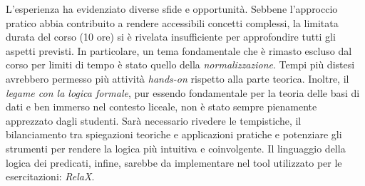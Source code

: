 \documentclass[withtimes]{easychair}
\begin{document}
L'esperienza ha evidenziato diverse sfide e opportunità. Sebbene l'approccio pratico abbia contribuito a rendere accessibili concetti complessi, la limitata durata del corso (10 ore) si è rivelata insufficiente per approfondire tutti gli aspetti previsti. In particolare, un tema fondamentale che è rimasto escluso dal corso per limiti di tempo è stato quello della \emph{normalizzazione}. Tempi più distesi avrebbero permesso più attività \emph{hands-on} rispetto alla parte teorica. Inoltre, il \emph{legame con la logica formale}, pur essendo fondamentale per la teoria delle basi di dati e ben immerso nel contesto liceale, non è stato sempre pienamente apprezzato dagli studenti. Sarà necessario rivedere le tempistiche, il bilanciamento tra spiegazioni teoriche e applicazioni pratiche e potenziare gli strumenti per rendere la logica più intuitiva e coinvolgente. Il linguaggio della logica dei predicati, infine, sarebbe da implementare nel tool utilizzato per le esercitazioni: \emph{RelaX}.

\label{sect:bib}
\printbibliography
\end{document}
